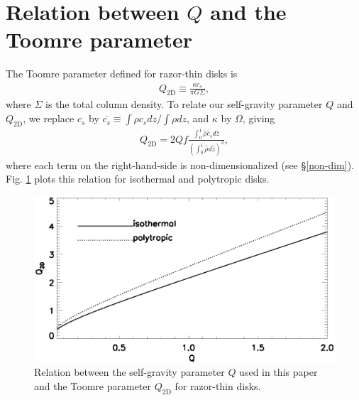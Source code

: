 \section{Relation between $Q$ and the Toomre parameter}\label{q3d2d}
The Toomre parameter defined for razor-thin disks is 
\begin{align} 
  Q_\mathrm{2D}\equiv \frac{\kappa c_s}{\pi G\Sigma},  
\end{align}
where $\Sigma$ is the total column density. To relate our
self-gravity parameter $Q$ and $Q_\mathrm{2D}$, we replace $c_s$ by
$\overline{c_s}\equiv\int\rho c_s dz/\int\rho dz$, and 
$\kappa$ by $\Omega$, giving
\begin{align}
  Q_\mathrm{2D} = 2Qf \frac{\int_0^1
    \hat{\rho} \hat{c}_s
    d\hat{z}}{\left(\int_0^1 \hat{\rho} d\hat{z}\right)^2},   
\end{align}
where each term on the right-hand-side is non-dimensionalized (see
\S\ref{non-dim}). Fig. \ref{plot_q3d2d} plots this relation 
for isothermal and polytropic disks.  

\begin{figure}
  \includegraphics[width=\linewidth]{figures/q2d_iso}
  \caption{Relation between the self-gravity parameter $Q$ used in
    this paper and the Toomre parameter $Q_\mathrm{2D}$ for razor-thin
    disks. 
    \label{plot_q3d2d}}
\end{figure}


